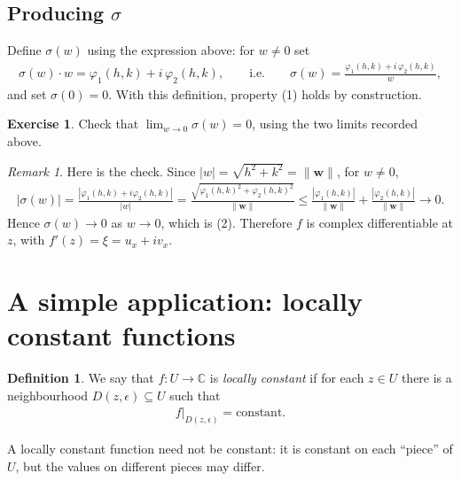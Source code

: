 \documentclass[11pt]{article}
\theoremstyle{plain}
\theoremstyle{definition}
\newtheorem{definition}[theorem]{Definition}
\newtheorem{exercise}[theorem]{Exercise}
\theoremstyle{remark}
\newtheorem*{remark}{Remark}
\numberwithin{equation}{section}
\newcommand{\be}{\begin{eqnarray}}
\newcommand{\ee}{\end{eqnarray}}
\newcommand{\C}{\mathbb{C}}
\newcommand{\R}{\mathbb{R}}
\newcommand{\ww}{\mathbf w}
\begin{document}
\subsection{Producing $\sigma$}
Define $\sigma(w)$ using the expression above: for $w\ne0$ set
\be
 \sigma(w)\cdot w=\varphi_1(h,k)+i\,\varphi_2(h,k),
 \qquad\text{i.e.}\qquad
 \sigma(w)=\frac{\varphi_1(h,k)+i\,\varphi_2(h,k)}{w},
\ee
and set $\sigma(0)=0$. With this definition, property (1) holds by
construction.

\begin{exercise}
Check that $\displaystyle\lim_{w\to0}\sigma(w)=0$, using the two limits
recorded above.
\end{exercise}

\begin{remark}
Here is the check. Since $|w|=\sqrt{h^2+k^2}=\|\ww\|$, for $w\ne0$,
\be
 |\sigma(w)|
 =\frac{|\varphi_1(h,k)+i\varphi_2(h,k)|}{|w|}
 =\frac{\sqrt{\varphi_1(h,k)^2+\varphi_2(h,k)^2}}{\|\ww\|}
 \le\frac{|\varphi_1(h,k)|}{\|\ww\|}+\frac{|\varphi_2(h,k)|}{\|\ww\|}
 \longrightarrow0.
\ee
Hence $\sigma(w)\to0$ as $w\to0$, which is (2). Therefore $f$ is complex
differentiable at $z$, with $f'(z)=\xi=u_x+iv_x$. \qedhere
\end{remark}

\section{A simple application: locally constant functions}
\begin{definition}
We say that $f:U\to\C$ is \emph{locally constant} if for each $z\in U$
there is a neighbourhood $D(z,\epsilon)\subseteq U$ such that
\be
 f\big|_{D(z,\epsilon)}=\text{constant}.
\ee
\end{definition}

A locally constant function need not be constant: it is constant on each
``piece'' of $U$, but the values on different pieces may differ.
\end{document}
